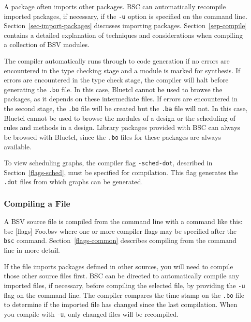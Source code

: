 \documentclass{article}
\newcommand{\te}[1]{\texttt{#1}}
\newenvironment{centerboxverbatim}
  {\center
   \boxedverbatim}
  {\endboxedverbatim
  {\endcenter }}
\begin{document}
A  package  often imports other packages.  BSC can automatically recompile
imported packages, if necessary, if the \te{-u} option is specified on the
command line.  Section~\ref{sec-import-packages}
discusses importing packages. Section~\ref{sep-compile} contains
 a detailed explanation of  techniques and considerations
when  compiling a collection of BSV modules.

The compiler  automatically runs through to code generation if no
errors are  encountered in the type checking stage and a module is
marked for synthesis.  If errors are encountered in the type check
stage,  the compiler will halt before generating the
\te{.bo} file.  In this case, Bluetcl cannot be used to browse
the packages, as it depends on these intermediate files.
If errors are encountered in the second stage, the
\te{.bo} file will be created but the \te{.ba} file will not.
In this case, Bluetcl cannot be used to browse the modules of a
design or the scheduling of rules and methods in a design.
Library packages provided with BSC can always be browsed with
Bluetcl, since the \te{.bo} files for these packages are
always available.

\index{-sched-dot@\te{-sched-dot} (compiler flag)}
To view scheduling graphs, the compiler flag \te{-sched-dot},
described in Section~\ref{flags-sched}, must be specified for
compilation.  This flag generates the \te{.dot} files
from which graphs can be generated.


\subsubsection{Compiling a File}

A BSV source file is compiled from the command line with a command like this:
\begin{centerboxverbatim}
bsc [flags] Foo.bsv
\end{centerboxverbatim}
where one or more compiler flags may be specified after the \te{bsc} command.
Section~\ref{flags-common} describes compiling from the command line
in more detail.

If the file imports packages defined in other sources, you will need to
compile those other source files first.  BSC can be directed to
automatically compile any imported files, if necessary, before compiling
the selected file, by providing the \te{-u} flag on the command line.
The compiler compares the time stamp on the \te{.bo} file
to determine if the imported file has changed since the last
compilation.  When you compile with \te{-u}, only changed files
will be recompiled.
\end{document}
